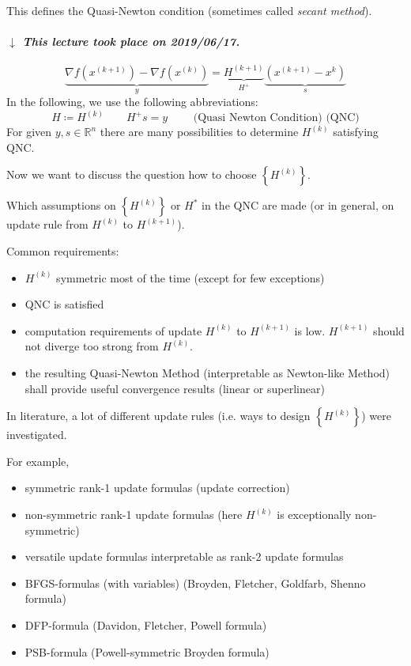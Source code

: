 \documentclass[a4paper]{article}
\numberwithin{lecref}{subsection}
\newcommand{\Set}[1]{\left\{#1\right\}}
\newcommand{\dateref}[1]{%
  \begin{mdframed}[backgroundcolor=gray!10,innerbottommargin=0pt,innertopmargin=0pt]
    \paragraph{\textit{$\downarrow$ This lecture took place on #1.}}%
  \end{mdframed}%
}
\begin{document}
This defines the Quasi-Newton condition (sometimes called \emph{secant method}).

\dateref{2019/06/17}

\[ \underbrace{\nabla f(x^{(k+1)}) - \nabla f(x^{(k)})}_{y} = \underbrace{H^{(k+1)}}_{H^+} \underbrace{\left(x^{(k+1)} - x^k\right)}_s \]
In the following, we use the following abbreviations:
\[ H \coloneqq H^{(k)} \qquad H^+ s = y \qquad \text{ (Quasi Newton Condition) (QNC)} \]
For given $y, s \in \mathbb R^n$ there are many possibilities to determine $H^{(k)}$ satisfying QNC.

Now we want to discuss the question how to choose $\Set{H^{(k)}}$.

Which assumptions on $\Set{H^{(k)}}$ or $H^*$ in the QNC are made (or in general, on update rule from $H^{(k)}$ to $H^{(k+1)}$).

Common requirements:
\begin{itemize}
	\item $H^{(k)}$ symmetric most of the time (except for few exceptions)
	\item QNC is satisfied
	\item computation requirements of update $H^{(k)}$ to $H^{(k+1)}$ is low. $H^{(k+1)}$ should not diverge too strong from $H^{(k)}$.
	\item the resulting Quasi-Newton Method (interpretable as Newton-like Method) shall provide useful convergence results (linear or superlinear)
\end{itemize}

In literature, a lot of different update rules (i.e. ways to design $\Set{H^{(k)}}$) were investigated.

For example,
\begin{itemize}
	\item symmetric rank-1 update formulas (update correction)
	\item non-symmetric rank-1 update formulas (here $H^{(k)}$ is exceptionally non-symmetric)
	\item versatile update formulas interpretable as rank-2 update formulas
	\item BFGS-formulas (with variables) (Broyden, Fletcher, Goldfarb, Shenno formula)
	\item DFP-formula (Davidon, Fletcher, Powell formula)
	\item PSB-formula (Powell-symmetric Broyden formula)
\end{itemize}
\end{document}
